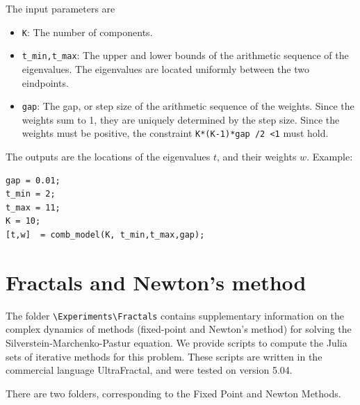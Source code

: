 \documentclass[english,11pt]{article} %
\begin{document}
The input parameters are 

\begin{itemize}
\item \verb+K+:  The number of components.
\item \verb+t_min,t_max+:  The upper and lower bounds of the arithmetic sequence of the eigenvalues. The eigenvalues are located uniformly between the two eindpoints.
\item \verb+gap+: The gap, or step size of the arithmetic sequence of the weights. Since the weights sum to 1, they are uniquely determined by the step size. Since the weights must be positive, the constraint \verb+K*(K-1)*gap /2 <1+ must hold. 
\end{itemize}

The outputs are the locations of the eigenvalues $t$, and their weights $w$. 
Example:

\begin{verbatim}
gap = 0.01;
t_min = 2;
t_max = 11;
K = 10;
[t,w]  = comb_model(K, t_min,t_max,gap);
\end{verbatim}

\section{Fractals and Newton's method}

The  folder \verb+\Experiments\Fractals+  contains supplementary information on the complex dynamics of methods (fixed-point and Newton's method) for solving the Silverstein-Marchenko-Pastur equation. We provide scripts to compute the Julia sets of iterative methods for 
this problem. These scripts are written in the commercial language UltraFractal, and were tested on version 5.04. 

There are two folders, corresponding to the Fixed Point and Newton Methods.
\end{document}
